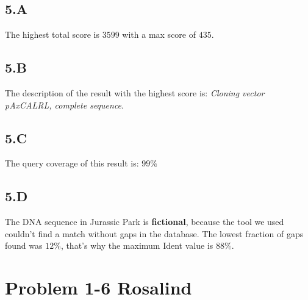 \documentclass{article}
\begin{document}
\subsection*{5.A}
The highest total score is $3599$ with a max score of $435$.

\subsection*{5.B}
The description of the result with the highest score is: \textit{Cloning vector pAxCALRL, complete sequence}.

\subsection*{5.C}
The query coverage of this result is: $99\%$

\subsection*{5.D}
The DNA sequence in Jurassic Park is \textbf{fictional}, because the tool we used couldn't find a match without gaps in the database. The lowest fraction of gaps found was $12\%$, that's why the maximum Ident value is $88\%$.

\section*{Problem 1-6 Rosalind}
\end{document}
